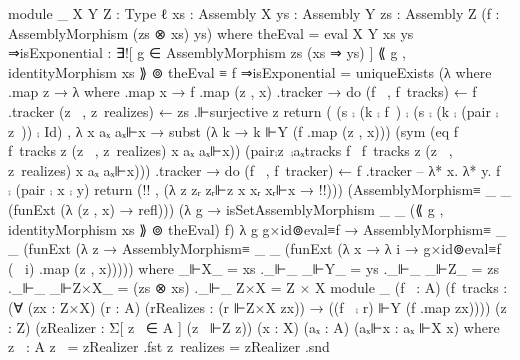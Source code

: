   module _ {X Y Z : Type ℓ}
           {xs : Assembly X}
           {ys : Assembly Y}
           {zs : Assembly Z}
           (f : AssemblyMorphism (zs ⊗ xs) ys) where
         theEval = eval {X} {Y} xs ys
         ⇒isExponential : ∃![ g ∈ AssemblyMorphism zs (xs ⇒ ys) ]
                          ⟪ g , identityMorphism xs ⟫ ⊚ theEval ≡ f
         ⇒isExponential = uniqueExists (λ where
                                           .map z → λ where
                                                        .map x → f .map (z , x)
                                                        .tracker → do
                                                                    (f~ , f~tracks) ← f .tracker
                                                                    (z~ , z~realizes) ← zs .⊩surjective z
                                                                    return ( (s ⨾ (k ⨾ f~) ⨾ (s ⨾ (k ⨾ (pair ⨾ z~)) ⨾ Id)
                                                                           , λ x aₓ aₓ⊩x
                                                                           → subst (λ k → k ⊩Y (f .map (z , x)))
                                                                             (sym (eq f~ f~tracks z (z~ , z~realizes) x aₓ aₓ⊩x))
                                                                             (pair⨾z~⨾aₓtracks f~ f~tracks z (z~ , z~realizes) x aₓ aₓ⊩x)))
                                           .tracker → do
                                                       (f~ , f~tracker) ← f .tracker
                                                       -- λ* x. λ* y. f~ ⨾ (pair ⨾ x ⨾ y)
                                                       return ({!!} , (λ z zᵣ zᵣ⊩z x xᵣ xᵣ⊩x → {!!})))
                                        (AssemblyMorphism≡ _ _ (funExt (λ (z , x) → refl)))
                                        (λ g → isSetAssemblyMorphism _ _ (⟪ g , identityMorphism xs ⟫ ⊚ theEval) f)
                                        λ g g×id⊚eval≡f → AssemblyMorphism≡ _ _
                                                          (funExt (λ z → AssemblyMorphism≡ _ _
                                                                         (funExt (λ x → λ i → g×id⊚eval≡f (~ i) .map (z , x))))) where
                         _⊩X_ = xs ._⊩_
                         _⊩Y_ = ys ._⊩_
                         _⊩Z_ = zs ._⊩_
                         _⊩Z×X_ = (zs ⊗ xs) ._⊩_
                         Z×X = Z × X
                         module _ (f~ : A)
                                   (f~tracks : (∀ (zx : Z×X) (r : A) (rRealizes : (r ⊩Z×X zx)) → ((f~ ⨾ r) ⊩Y (f .map zx))))
                                   (z : Z)
                                   (zRealizer : Σ[ z~ ∈ A ] (z~ ⊩Z z))
                                   (x : X)
                                   (aₓ : A)
                                   (aₓ⊩x : aₓ ⊩X x) where
                            z~ : A
                            z~ = zRealizer .fst
                            z~realizes = zRealizer .snd

